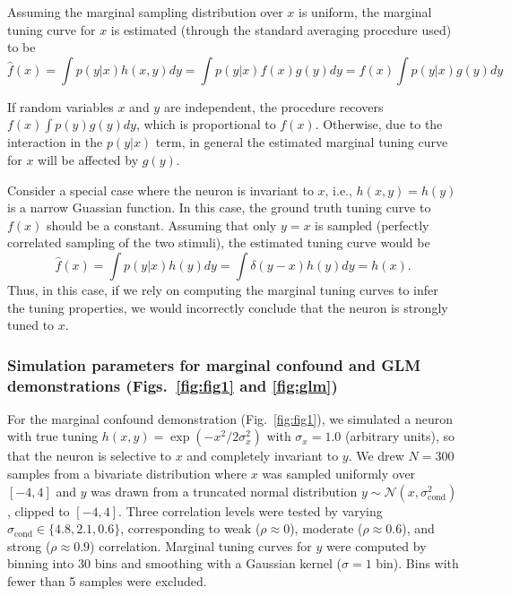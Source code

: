 \documentclass[11pt]{article}
\begin{document}
Assuming the marginal sampling distribution over $x$ is uniform, the marginal tuning curve for $x$ is estimated (through the standard averaging procedure used) to be
$$
\hat{f}(x) = \int p(y|x)h(x,y)dy = \int p(y|x)f(x) g(y)dy =f(x)\int p(y|x)g(y)dy
$$


If random variables $x$ and $y$ are independent, the procedure recovers $f(x)\int p(y)g(y)dy$, which is proportional to $f(x)$. Otherwise, due to the interaction in the $p(y|x)$ term, in general the estimated marginal tuning curve for $x$ will be affected by $g(y)$. 

Consider a special case where the neuron is invariant to $x$, i.e., $h(x,y)=h(y)$ is a narrow Guassian function. In this case, the ground truth tuning curve to $f(x)$ should be a constant. Assuming that only $y=x$ is sampled (perfectly correlated sampling of the two stimuli), the estimated tuning curve would be
$$
\hat{f}(x) = \int p(y|x)h(y)dy = \int \delta(y-x)h(y)dy=h(x).
$$
Thus, in this case, if we rely on computing the marginal tuning curves to infer the tuning properties, we would incorrectly conclude that the neuron is strongly tuned to $x$.

\subsubsection*{Simulation parameters for marginal confound and GLM demonstrations (Figs.~\ref{fig:fig1} and \ref{fig:glm})}

For the marginal confound demonstration (Fig.~\ref{fig:fig1}), we simulated a neuron with true tuning $h(x,y) = \exp(-x^2 / 2\sigma_x^2)$ with $\sigma_x = 1.0$ (arbitrary units), so that the neuron is selective to $x$ and completely invariant to $y$. We drew $N = 300$ samples from a bivariate distribution where $x$ was sampled uniformly over $[-4, 4]$ and $y$ was drawn from a truncated normal distribution $y \sim \mathcal{N}(x, \sigma_{\mathrm{cond}}^2)$, clipped to $[-4, 4]$. Three correlation levels were tested by varying $\sigma_{\mathrm{cond}} \in \{4.8, 2.1, 0.6\}$, corresponding to weak ($\rho \approx 0$), moderate ($\rho \approx 0.6$), and strong ($\rho \approx 0.9$) correlation. Marginal tuning curves for $y$ were computed by binning into 30 bins and smoothing with a Gaussian kernel ($\sigma = 1$ bin). Bins with fewer than 5 samples were excluded.
\end{document}
